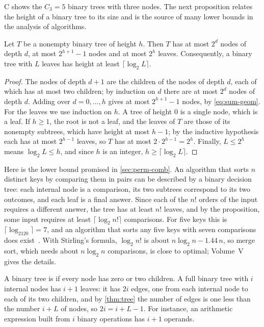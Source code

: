 C shows the $C_3=5$ binary trees with three nodes. The next proposition relates the height of a binary tree to its size and is the source of many lower bounds in the analysis of algorithms.

\begin{proposition}
\label{prop:binary-height}
Let $T$ be a nonempty binary tree of height $h$. Then $T$ has at most $2^d$ nodes of depth $d$, at most $2^{h+1}-1$ nodes and at most $2^h$ leaves. Consequently, a binary tree with $L$ leaves has height at least $\lceil\log_2L\rceil$.
\end{proposition}

\begin{proof}
The nodes of depth $d+1$ are the children of the nodes of depth $d$, each of which has at most two children; by induction on $d$ there are at most $2^d$ nodes of depth $d$. Adding over $d=0,\ldots,h$ gives at most $2^{h+1}-1$ nodes, by \eqref{eq:sum-geom}. For the leaves we use induction on $h$. A tree of height $0$ is a single node, which is a leaf. If $h\ge1$, the root is not a leaf, and the leaves of $T$ are those of its nonempty subtrees, which have height at most $h-1$; by the inductive hypothesis each has at most $2^{h-1}$ leaves, so $T$ has at most $2\cdot2^{h-1}=2^h$. Finally, $L\le2^h$ means $\log_2L\le h$, and since $h$ is an integer, $h\ge\lceil\log_2L\rceil$.
\end{proof}

Here is the lower bound promised in \cref{sec:perm-comb}. An algorithm that sorts $n$ distinct keys by comparing them in pairs can be described by a binary decision tree: each internal node is a comparison, its two subtrees correspond to its two outcomes, and each leaf is a final answer. Since each of the $n!$ orders of the input requires a different answer, the tree has at least $n!$ leaves, and by the proposition, some input requires at least $\lceil\log_2n!\rceil$ comparisons. For five keys this is $\lceil\log_2120\rceil=7$, and an algorithm that sorts any five keys with seven comparisons does exist~\cite[Sect.~5.3.1]{knuth1998taocp3}. With Stirling's formula, $\log_2n!$ is about $n\log_2n-1.44\,n$, so merge sort, which needs about $n\log_2n$ comparisons, is close to optimal; Volume~V gives the details.

A binary tree is  if every node has zero or two children. A full binary tree with $i$ internal nodes has $i+1$ leaves: it has $2i$ edges, one from each internal node to each of its two children, and by \cref{thm:tree} the number of edges is one less than the number $i+L$ of nodes, so $2i=i+L-1$. For instance, an arithmetic expression built from $i$ binary operations has $i+1$ operands.


